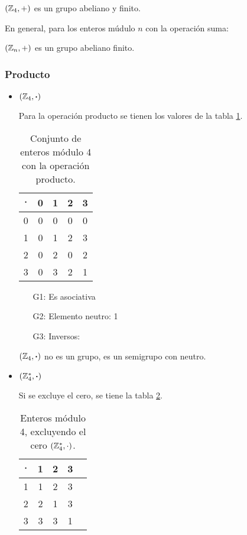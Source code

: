 \begin{center}
	$(\mathbb{Z}_4, +)$ es un grupo abeliano y finito.
\end{center}

En general, para los enteros múdulo $n$ con la operación suma:
\begin{center}
	$(\mathbb{Z}_n, +)$ es un grupo abeliano finito.
\end{center}

\subsubsection{Producto}

\begin{itemize}
	\item $(\mathbb{Z}_4, \boldsymbol{\cdot})$
	
	Para la operación producto se tienen los valores de la tabla \ref{tab:mod4p}.
	\begin{table}[H]
		\centering
		\begin{tabular}{c|cccc}
			$\boldsymbol{\cdot}$ & 0 & 1 & 2 & 3\\
			\hline
			0 & 0 & 0 & 0 & 0\\
			1 & 0 & 1 & 2 & 3\\
			2 & 0 & 2 & 0 & 2\\
			3 & 0 & 3 & 2 & 1\\
		\end{tabular}
		\caption{Conjunto de enteros módulo 4 con la operación producto.}
		\label{tab:mod4p}
	\end{table}
	
	\begin{itemize}
		\item[G1:] Es asociativa \cmark
		\item[G2:] Elemento neutro: 1 \cmark
		\item[G3:] Inversos: \xmark
	\end{itemize}
	
	\begin{center}
		$(\mathbb{Z}_4, \boldsymbol{\cdot})$ no es un grupo, es un semigrupo con neutro.
	\end{center}
	
	\item $(\mathbb{Z}^{*}_4, \boldsymbol{\cdot})$
	
	Si se excluye el cero, se tiene la tabla \ref{tab:mod4pa}.
	
	\begin{table}[H]
		\centering
		\begin{tabular}{c|cccc}
			$\boldsymbol{\cdot}$ & 1 & 2 & 3\\
			\hline
			1 & 1 & 2 & 3\\
			2 & 2 & 1 & 3\\
			3 & 3 & 3 & 1
		\end{tabular}
		\caption{Enteros módulo 4, excluyendo el cero $(\mathbb{Z}^{*}_4, \cdot)$.}
		\label{tab:mod4pa}
	\end{table}
	

\end{itemize}
